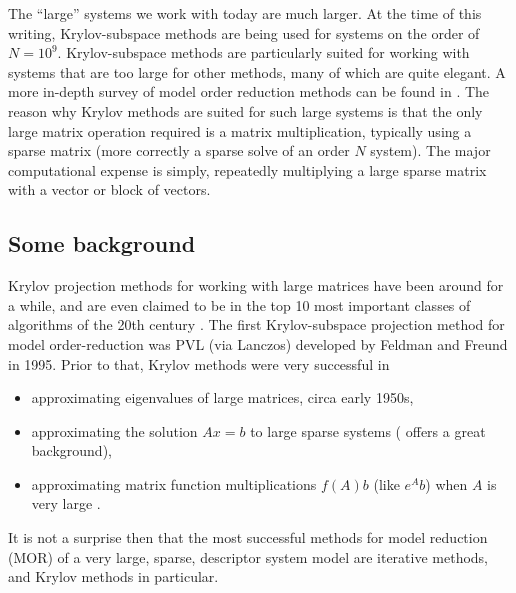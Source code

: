 The ``large'' systems we work with today are much larger.  At the time of this writing, Krylov-subspace methods are being used for systems on the order of $N=10^9$.   Krylov-subspace methods are particularly suited for working with systems that are too large for other methods, many of which are quite elegant.  A more in-depth survey of model order reduction methods can be found in \cite{Rommes2008}. The reason why Krylov methods are suited for such large systems is that the only large matrix operation required is a matrix multiplication, typically using a sparse matrix (more correctly a sparse solve of an order $N$ system).    The major computational expense is simply, repeatedly multiplying a large sparse matrix with a vector or block of vectors. 
    

\subsection{Some background} 
Krylov projection methods for working with large matrices have been around for a while, and are even claimed to be in the top 10 most important  classes of algorithms of the 20th century \cite{top10alg}.  
The first Krylov-subspace projection method for model order-reduction was PVL (\pade via Lanczos)  \cite{PVL} developed by Feldman and Freund in 1995.  Prior to that, Krylov methods were very successful in
\begin{itemize}
\singlespacing
\item approximating eigenvalues of large matrices,\cite{lanczos,arnoldi} circa early 1950s,  
\item approximating the solution $Ax=b$ to  large sparse systems 
(\cite{saad1981krylov} offers a great background),
\item approximating matrix function multiplications $f(A)b$ (like $e^A b$) when $A$ is very large \cite{krylov_matfun_eval}.   
\end{itemize}

It is not a surprise then that the most successful methods for model  reduction (MOR) of a very large, sparse, descriptor system model are iterative methods, and Krylov methods in particular.     


